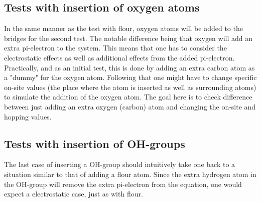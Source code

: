 \subsection{Tests with insertion of oxygen atoms}
In the same manner as the test with flour, oxygen atoms will be added to the bridges for the second test. The notable difference being that oxygen will add an extra pi-electron to the system. This means that one has to consider the electrostatic effects as well as additional effects from the added pi-electron. Practically, and as an initial test, this is done by adding an extra carbon atom as a "dummy" for the oxygen atom. Following that one might have to change specific on-site values (the place where the atom is inserted as well as surrounding atoms) to simulate the addition of the oxygen atom. The goal here is to check difference between just adding an extra oxygen (carbon) atom and changing the on-site and hopping values.
\subsection{Tests with insertion of OH-groups}
The last case of inserting a OH-group should intuitively take one back to a situation similar to that of adding a flour atom. Since the extra hydrogen atom in the OH-group will remove the extra pi-electron from the equation, one would expect a electrostatic case, just as with flour.
